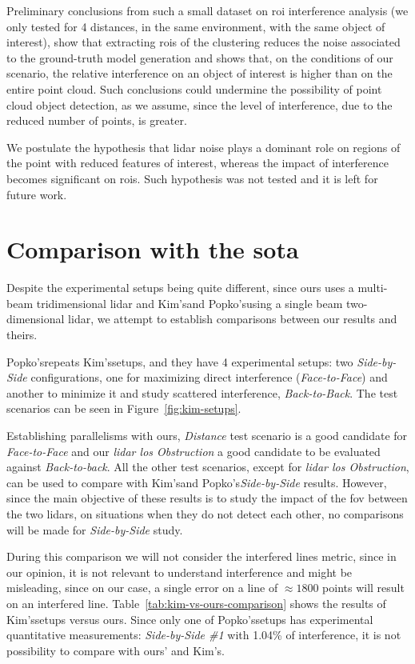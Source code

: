 Preliminary conclusions from such a small dataset on \ac{roi} interference analysis (we only tested for 4 distances, in the same environment, with the same object of interest), show that extracting \acp{roi} of the clustering reduces the noise associated to the ground-truth model generation and shows that, on the conditions of our scenario, the relative interference on an object of interest is higher than on the entire point cloud. Such conclusions could undermine the possibility of point cloud object detection, as we assume, since the level of interference, due to the reduced number of points, is greater.

We postulate the hypothesis that \ac{lidar} noise plays a dominant role on regions of the point with reduced features of interest, whereas the impact of interference becomes significant on \acp{roi}. Such hypothesis was not tested and it is left for future work.


\section{Comparison with the \acl{sota}}
\label{sec:lidar-interference:sota-comparison}
Despite the experimental setups being quite different, since ours uses a multi-beam tridimensional \ac{lidar} and Kim's\etal and Popko's\etal using a single beam two-dimensional \ac{lidar}, we attempt to establish comparisons between our results and theirs.

Popko's\etal repeats Kim's\etal setups, and they have 4 experimental setups: two \textit{Side-by-Side} configurations, one for maximizing direct interference (\textit{Face-to-Face}) and another to minimize it and study scattered interference, \textit{Back-to-Back}. The test scenarios can be seen in Figure~\ref{fig:kim-setups}. 

Establishing parallelisms with ours, \textit{Distance} test scenario is a good candidate for \textit{Face-to-Face} and our \textit{\ac{lidar} \ac{los} Obstruction} a good candidate to be evaluated against \textit{Back-to-back}. All the other test scenarios, except for \textit{\ac{lidar} \ac{los} Obstruction}, can be used to compare with Kim's\etal and Popko's\etal \textit{Side-by-Side} results. However, since the main objective of these results is to study the impact of the \ac{fov} between the two \acp{lidar}, on situations when they do not detect each other, no comparisons will be made for \textit{Side-by-Side} study.


During this comparison we will not consider the interfered lines metric, since in our opinion, it is not relevant to understand interference and might be misleading, since on our case, a single error on a line of $\approx 1800$ points will result on an interfered line. Table~\ref{tab:kim-vs-ours-comparison} shows the results of Kim's\etal setups versus ours. Since only one of Popko's\etal setups has experimental quantitative measurements: \textit{Side-by-Side \#1} with 1.04\% of interference, it is not possibility to compare with ours' and Kim's\etal.


